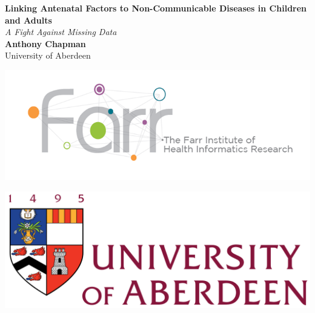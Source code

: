 \documentclass[a0,portrait]{a0poster}
\begin{document}


\begin{minipage}[b]{0.43\linewidth}
\veryHuge \color{NavyBlue} \textbf{Linking Antenatal Factors to Non-Communicable Diseases in Children and Adults} \color{Black}\\ %
\Huge\textit{A Fight Against Missing Data}\\[1cm] %
\huge \textbf{Anthony Chapman}\\ %
\huge University of Aberdeen\\ %
\end{minipage}
%
\begin{minipage}[b]{0.21\linewidth}
\includegraphics[width=32cm]{logo-farr-big.png} %
\end{minipage}
% 
\begin{minipage}[b]{0.19\linewidth}
\includegraphics[width=27cm]{logo.png}
\\\\\\\\\\\\\\
\end{minipage}
\end{document}
